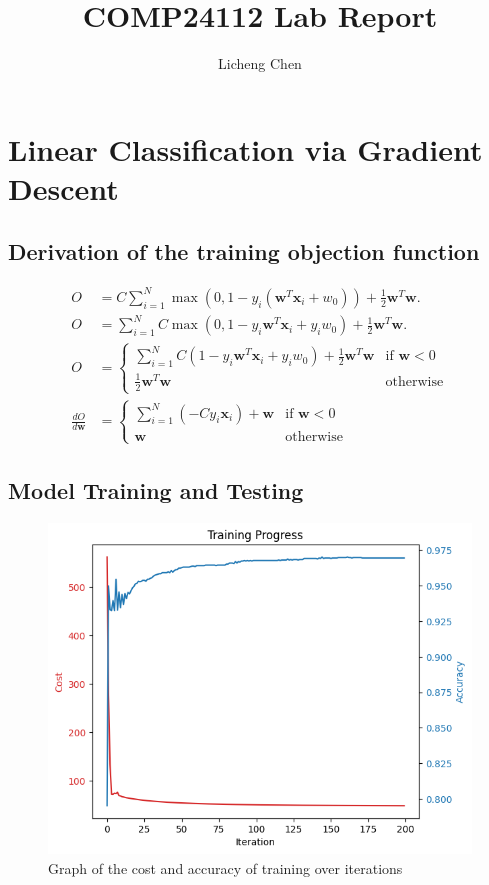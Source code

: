 \documentclass[a4paper]{article}
\title{COMP24112 Lab Report}
\author{Licheng Chen}
\begin{document}
\maketitle
\newpage
\section{Linear Classification via Gradient Descent}

\subsection{Derivation of the training objection function}

\begin{align*}
    O             & = C \sum^N_{i=1}\max\left(0, 1 - y_i \left(\mathbf{w}^T\mathbf{x}_i + w_0\right)\right) + \frac{1}{2}\mathbf{w}^T\mathbf{w}. \\
    O             & = \sum^N_{i=1}C\max\left(0, 1 - y_i\mathbf{w}^T\mathbf{x}_i + y_iw_0\right) + \frac{1}{2}\mathbf{w}^T\mathbf{w}.             \\
    O             & =
    \begin{cases}
        \sum^N_{i=1}C(1 - y_i\mathbf{w}^T\mathbf{x}_i + y_iw_0) + \frac{1}{2}\mathbf{w}^T\mathbf{w} & \text{if } \mathbf{w} < 0 \\
        \frac{1}{2}\mathbf{w}^T\mathbf{w}                                                           & \text{otherwise}
    \end{cases}                      \\
    \frac{dO}{d\mathbf{w}} & =
    \begin{cases}
        \sum^N_{i=1}(-Cy_i\mathbf{x}_i) + \mathbf{w} & \text{if } \mathbf{w} < 0 \\
        \mathbf{w}                                   & \text{otherwise}
    \end{cases}
\end{align*}



\subsection{Model Training and Testing}
\begin{figure}[htbp]
    \centering
    \includegraphics[width=0.5\linewidth]{1.11.png}
    \caption{\centering Graph of the cost and accuracy of training over iterations}
\end{figure}
\end{document}

